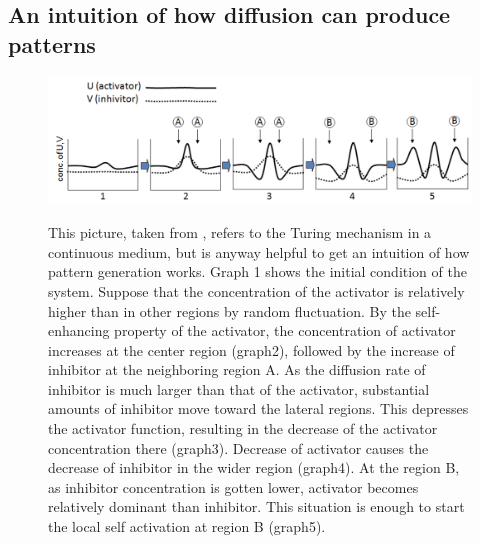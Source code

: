 \subsection*{An intuition of how diffusion can produce patterns}
\begin{figure}[H]
    \centering
    \includegraphics[width=\linewidth]{latex_source/images/turing/key_mechanism.png}
    \label{fig:key}
    \caption{ This picture, taken from \cite{bio_article}, refers to the Turing mechanism in a continuous medium, but is anyway helpful to get an intuition of how pattern generation works. Graph 1 shows the initial condition of the system. Suppose that the concentration of the
activator is relatively higher than in other regions by random fluctuation. By the
self-enhancing property of the activator, the concentration of activator increases at the
center region (graph2), followed by the increase of inhibitor at the neighboring region A.
As the diffusion rate of inhibitor is much larger than that of the activator, substantial
amounts of inhibitor move toward the lateral regions. This depresses the activator
function, resulting in the decrease of the activator concentration there (graph3).
Decrease of activator causes the decrease of inhibitor in the wider region (graph4). At
the region B, as inhibitor concentration is gotten lower, activator becomes relatively
dominant than inhibitor. This situation is enough to start the local self activation at
region B (graph5).}
   \label{fig:key}
\end{figure}

